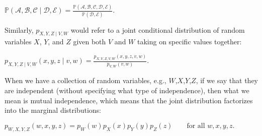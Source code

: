 \documentclass[6008notes.tex]{subfiles}
\begin{document}
{\centering$\mathbb {P}(\mathcal{A},\mathcal{B},\mathcal{C}\mid \mathcal{D},\mathcal{E})=\frac{\mathbb {P}(\mathcal{A},\mathcal{B},\mathcal{C},\mathcal{D},\mathcal{E})}{\mathbb {P}(\mathcal{D},\mathcal{E})}.$ \par}
 
Similarly, $p_{X,Y,Z\mid V,W}$ would refer to a joint conditional distribution of random variables $X$, $Y$, and $Z$ given both $V$ and $W$ taking on specific values together:

{\centering$p_{X,Y,Z\mid V,W}(x,y,z\mid v,w)=\frac{p_{X,Y,Z,V,W}(x,y,z,v,w)}{p_{V,W}(v,w)}.$ \par}
 
When we have a collection of random variables, e.g., $W$,$X$,$Y$,$Z$, if we say that they are independent (without specifying what type of independence), then what we mean is mutual independence, which means that the joint distribution factorizes into the marginal distributions:

{\centering$p_{W,X,Y,Z}(w,x,y,z)=p_{W}(w)p_{X}(x)p_{Y}(y)p_{Z}(z)\qquad \text {for all }w,x,y,z.$ \par}
\end{document}

